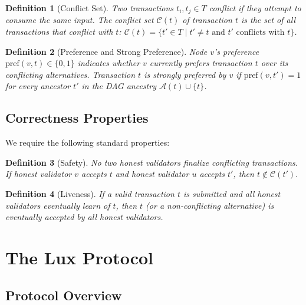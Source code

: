 \documentclass[11pt,a4paper]{article}
\newtheorem{definition}{Definition}[section]
\begin{document}
\begin{definition}[Conflict Set]
Two transactions $t_i, t_j \in T$ \emph{conflict} if they attempt to consume the same
input. The conflict set $\mathcal{C}(t)$ of transaction $t$ is the set of all transactions
that conflict with $t$: $\mathcal{C}(t) = \{t' \in T \mid t' \neq t \text{ and } t' \text{ conflicts with } t\}$.
\end{definition}

\begin{definition}[Preference and Strong Preference]
Node $v$'s preference $\text{pref}(v, t) \in \{0, 1\}$ indicates whether $v$ currently
prefers transaction $t$ over its conflicting alternatives. Transaction $t$ is \emph{strongly
preferred} by $v$ if $\text{pref}(v, t') = 1$ for every ancestor $t'$ in the DAG ancestry
$\mathcal{A}(t) \cup \{t\}$.
\end{definition}

\subsection{Correctness Properties}

We require the following standard properties:

\begin{definition}[Safety]
No two honest validators finalize conflicting transactions. If honest validator $v$ accepts
$t$ and honest validator $u$ accepts $t'$, then $t \notin \mathcal{C}(t')$.
\end{definition}

\begin{definition}[Liveness]
If a valid transaction $t$ is submitted and all honest validators eventually learn of $t$,
then $t$ (or a non-conflicting alternative) is eventually accepted by all honest validators.
\end{definition}

\section{The Lux Protocol}
\label{sec:protocol}

\subsection{Protocol Overview}
\end{document}
